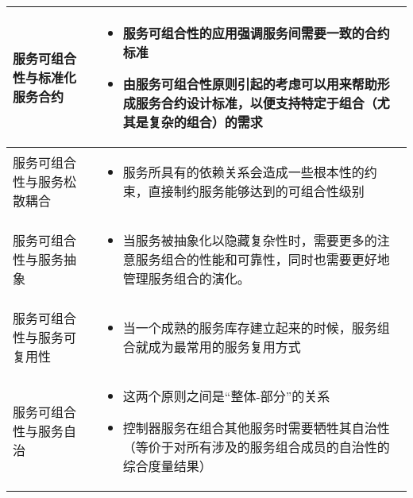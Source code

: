 \begin{longtable}{|m{3cm}<{\centering}|m{12cm}|}
    \hline
    服务可组合性与标准化服务合约
    & 
    \vspace{-1.3em}
    \begin{itemize}[leftmargin=1.5em,itemsep=-3pt,topsep=-3pt]
        \item 服务可组合性的应用强调服务间需要一致的合约标准
        \item 由服务可组合性原则引起的考虑可以用来帮助形成服务合约设计标准，以便支持特定于组合（尤其是复杂的组合）的需求        
    \vspace{-1.5em}
    \end{itemize}  
    \\ \hline
    服务可组合性与服务松散耦合
    & 
    \vspace{-1.3em}
    \begin{itemize}[leftmargin=1.5em,itemsep=-3pt,topsep=-3pt]
        \item 服务所具有的依赖关系会造成一些根本性的约束，直接制约服务能够达到的可组合性级别
    \vspace{-1.5em}
    \end{itemize}  
    \\ \hline
    服务可组合性与服务抽象
    & 
    \vspace{-1.3em}
    \begin{itemize}[leftmargin=1.5em,itemsep=-3pt,topsep=-3pt]
        \item 当服务被抽象化以隐藏复杂性时，需要更多的注意服务组合的性能和可靠性，同时也需要更好地管理服务组合的演化。
    \vspace{-1.5em}
    \end{itemize}  
    \\ \hline
    服务可组合性与服务可复用性
    & 
    \vspace{-1.3em}
    \begin{itemize}[leftmargin=1.5em,itemsep=-3pt,topsep=-3pt]
        \item 当一个成熟的服务库存建立起来的时候，服务组合就成为最常用的服务复用方式
    \vspace{-1.5em}
    \end{itemize}  
    \\ \hline
    服务可组合性与服务自治
    & 
    \vspace{-1.3em}
    \begin{itemize}[leftmargin=1.5em,itemsep=-3pt,topsep=-3pt]
        \item 这两个原则之间是“整体-部分”的关系
        \item 控制器服务在组合其他服务时需要牺牲其自治性（等价于对所有涉及的服务组合成员的自治性的综合度量结果）

\end{itemize}
\end{longtable}
